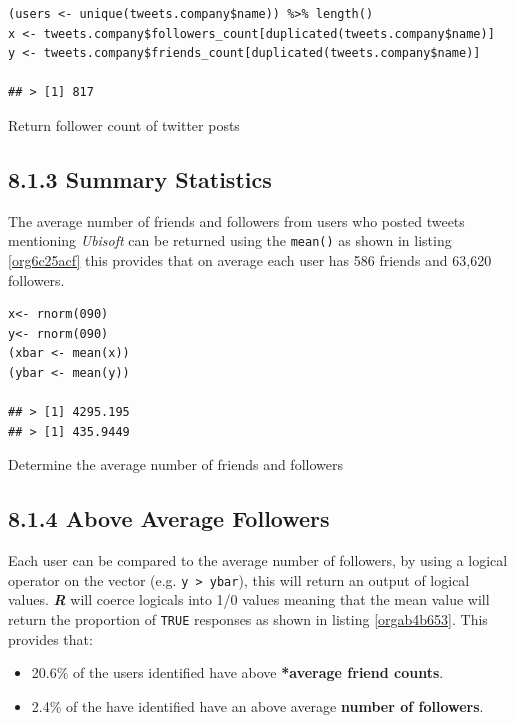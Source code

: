 \documentclass[11pt]{article}
\begin{document}
\begin{listing}[htbp]
\begin{verbatim}
(users <- unique(tweets.company$name)) %>% length()
x <- tweets.company$followers_count[duplicated(tweets.company$name)]
y <- tweets.company$friends_count[duplicated(tweets.company$name)]

## > [1] 817
\end{verbatim}
\caption{\label{org5ff7d68}Return follower count of twitter posts}
\end{listing}


\subsection{8.1.3 Summary Statistics}
\label{sec:orgf099317}
The average number of friends and followers from users who posted tweets mentioning \emph{Ubisoft} can be returned using the \texttt{mean()} as shown in listing \ref{org6c25acf}
this provides that on average each user has 586 friends and 63,620 followers.

\begin{listing}[htbp]
\begin{verbatim}
x<- rnorm(090)
y<- rnorm(090)
(xbar <- mean(x))
(ybar <- mean(y))

## > [1] 4295.195
## > [1] 435.9449
\end{verbatim}
\caption{\label{org6c25acf}Determine the average number of friends and followers}
\end{listing}

\subsection{8.1.4 Above Average Followers}
\label{sec:org7f8467c}
Each user can be compared to the average number of followers, by using a logical
operator on the vector (e.g. \texttt{y > ybar}), this will return an output of logical
values. \textbf{\emph{R}} will coerce logicals into 1/0 values meaning that the mean value
will return the proportion of \texttt{TRUE} responses as shown in listing \ref{orgab4b653}. This
provides that:

\begin{itemize}
\item 20.6\% of the users identified have above \textbf{*average friend counts}.
\item 2.4\%  of the have identified have an above average \textbf{number of followers}.
\end{itemize}
\end{document}
